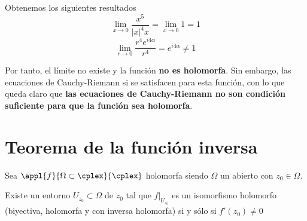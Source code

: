 \documentclass{apuntes}
\begin{document}
\begin{example}
\begin{enumerate}
Obtenemos los siguientes resultados
\[\lim_{x \to 0} \frac{x^5}{|x|^4x} = \lim_{x \to 0} 1 = 1\]
\[\lim_{r \to 0} \frac{r^4 e^{i4α}}{r^4} = e^{i4α} \neq 1\]

Por tanto, el límite no existe y la función \textbf{no es holomorfa}. Sin embargo, las ecuaciones de Cauchy-Riemann si se satisfacen para esta función, con lo que queda claro que \textbf{las ecuaciones de Cauchy-Riemann no son condición suficiente para que la función sea holomorfa}.
\end{enumerate}
\end{example}

\section{Teorema de la función inversa}
\begin{theorem}
Sea $\appl{f}{\Omega\subset \cplex}{\cplex}$ holomorfa siendo $\Omega$ un abierto con $z_0\in \Omega$.

Existe un entorno $U_{z_0}\subset \Omega$ de $z_0$ tal que $f|_{U_{z_0}}$ es un isomorfismo holomorfo (biyectiva, holomorfa y con inversa holomorfa) si y sólo si $f'(z_0)\neq 0$
\end{theorem}
\end{document}
